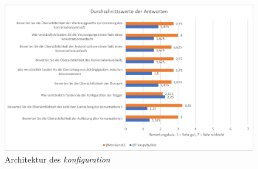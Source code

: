 \begin{figure}[h]
\centering
\includegraphics[width=1\textwidth]{pictures/diagramme/antwortendurchsch2}
\caption{Architektur des \emph{konfiguration}}
\label{antwortendurchsch22}
\end{figure}





